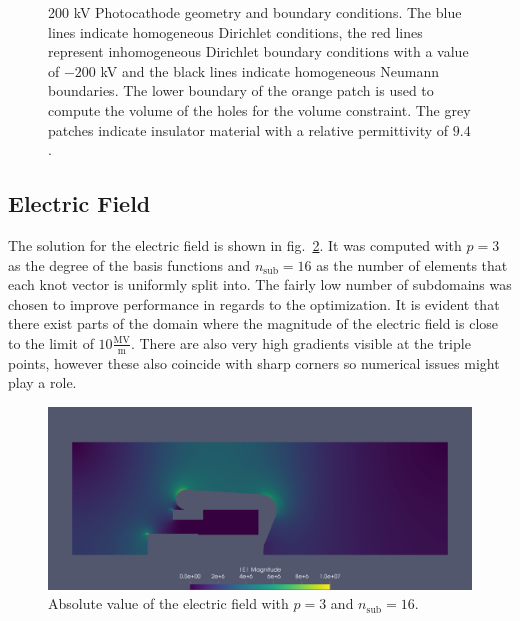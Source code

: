 \begin{center}
\begin{figure}[H]
  
  \caption{200 kV Photocathode geometry and boundary conditions. The blue lines indicate homogeneous Dirichlet conditions, the red lines represent inhomogeneous Dirichlet boundary conditions with a value of $-200$ kV and the black lines indicate homogeneous Neumann boundaries. The lower boundary of the orange patch is used to compute the volume of the holes for the volume constraint. The grey patches indicate insulator material with a relative permittivity of $9.4$.}
  \label{fig:200kV_geometry_v1}
\end{figure}
\end{center}

\subsection{Electric Field}
The solution for the electric field is shown in fig.~\ref{fig:200kV_electric_field}.
It was computed with $p=3$ as the degree of the basis functions and $n_\mathrm{sub}=16$ as the number of elements that each knot vector is uniformly split into. The fairly low number of subdomains was chosen to improve performance in regards to the optimization.
It is evident that there exist parts of the domain where the magnitude of the electric field is close to the limit of $10 \frac{\mathrm{MV}}{\mathrm{m}}$. There are also very high gradients visible at the triple points, however these also coincide with sharp corners so numerical issues might play a role.

\begin{center}
\begin{figure}[H]
  \includegraphics[width=\textwidth]{figures/200kV/png/order=3}
  \caption{Absolute value of the electric field with $p=3$ and $n_\mathrm{sub}=16$.}
  \label{fig:200kV_electric_field}
\end{figure}
\end{center}

